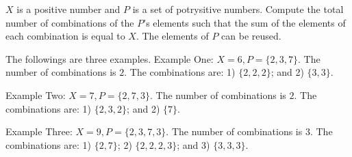 $X$ is a positive number and $P$ is a set of potrysitive numbers. 
Compute the total number of combinations of the $P$'s elements 
such that the sum of the elements of each combination is equal to $X$. 
The elements of $P$ can be reused.

The followings are three examples.
Example One: $X = 6, P = \{2, 3, 7\}$. 
The number of combinations is $2$. 
The combinations are: 1) $\{2,2,2\}$; and 2) $\{3,3\}$.

Example Two: $X = 7, P = \{2, 7, 3\}$. 
The number of combinations is $2$. 
The combinations are: 1) $\{2,3,2\}$; and 2) $\{7\}$.

Example Three: $X = 9, P = \{2, 3, 7, 3\}$. 
The number of combinations is $3$. 
The combinations are: 1) $\{2, 7\}$; 2) $\{2, 2, 2, 3\}$; and 3) $\{3, 3, 3\}$.

